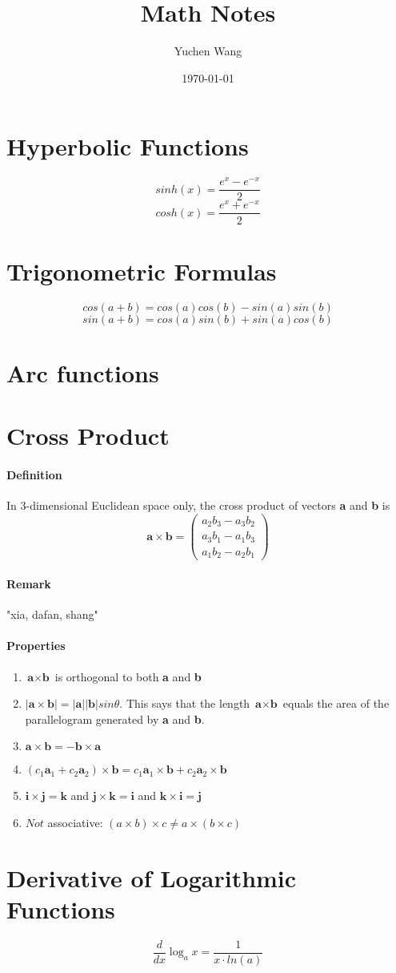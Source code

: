 \documentclass[11pt]{article}
\title{Math Notes}
\author{Yuchen Wang}
\date{\today}
\newcommand{\tb}[1]{\textbf{#1}}
\begin{document}
	\maketitle
	\tableofcontents
	\newpage
\section{Hyperbolic Functions} 
$$sinh(x) = \frac{e^x - e^{-x}}{2}$$
$$cosh(x) = \frac{e^x + e^{-x}}{2}$$
\section{Trigonometric Formulas}
$$cos(a+b) = cos(a)cos(b)-sin(a)sin(b)$$
$$sin(a+b) = cos(a)sin(b)+sin(a)cos(b)$$
\section{Arc functions}
\section{Cross Product}
\paragraph{Definition} In 3-dimensional Euclidean space only, the cross product of vectors \tb{a} and \tb{b} is 
$$\tb{a} \times \tb{b} = \begin{pmatrix}a_2b_3 - a_3b_2\\ a_3b_1-a_1b_3\\a_1b_2-a_2b_1\end{pmatrix}$$ 
\paragraph{Remark} "xia, dafan, shang"
\paragraph{Properties}
\begin{enumerate}
	\item $\tb{a} \times \tb{b}$ is orthogonal to both \tb{a} and \tb{b}
	\item $|\tb{a} \times \tb{b}| = |\tb{a}||\tb{b}|sin\theta$. This says that the length $\tb{a} \times \tb{b}$ equals the area of the parallelogram generated by \tb{a} and \tb{b}.
	\item $\tb{a} \times \tb{b} = -\tb{b} \times \tb{a}$
	\item $(c_1\tb{a}_1 + c_2\tb{a}_2) \times \tb{b} = c_1\tb{a}_1 \times \tb{b} + c_2\tb{a}_2 \times \tb{b}$
	\item $\tb{i} \times \tb{j} = \tb{k}$ and $\tb{j} \times \tb{k} = \tb{i}$ and $\tb{k} \times \tb{i} = \tb{j}$
	\item $Not$ associative: $(a \times b) \times c \neq a \times (b \times c)$
\end{enumerate} 
\section{Derivative of Logarithmic Functions}
$$\frac{d}{dx}\log_a{x} = \frac{1}{x \cdot ln(a)}$$
\end{document}
